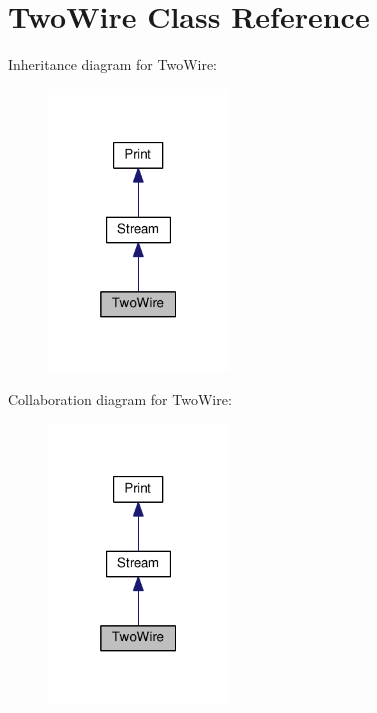 \hypertarget{class_two_wire}{}\section{Two\+Wire Class Reference}
\label{class_two_wire}


Inheritance diagram for Two\+Wire\+:\nopagebreak
\begin{figure}[H]
\begin{center}
\leavevmode
\includegraphics[width=136pt]{class_two_wire__inherit__graph}
\end{center}
\end{figure}


Collaboration diagram for Two\+Wire\+:\nopagebreak
\begin{figure}[H]
\begin{center}
\leavevmode
\includegraphics[width=136pt]{class_two_wire__coll__graph}
\end{center}
\end{figure}
